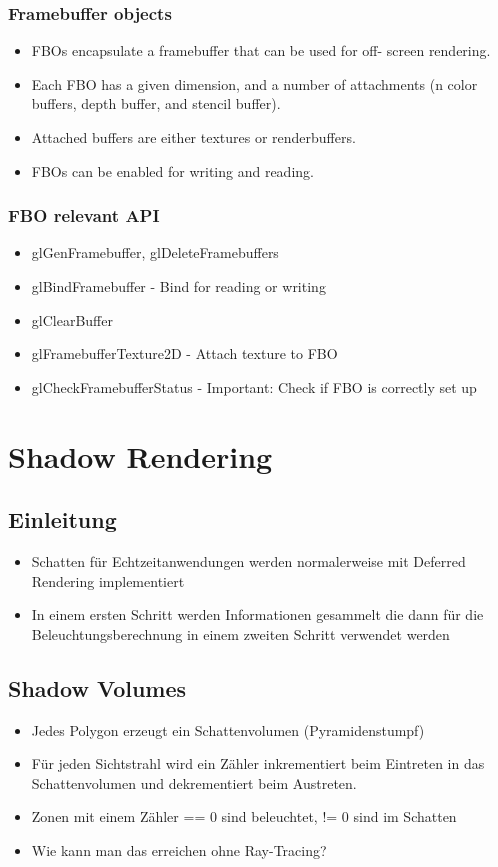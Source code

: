 \documentclass[10pt]{article}
\begin{document}
\subsubsection{Framebuffer objects}
\begin{itemize}
	\item FBOs encapsulate a framebuffer that can be used for off- screen rendering.
	\item Each FBO has a given dimension, and a number of attachments (n color buffers, depth buffer, and stencil buffer).
	\item Attached buffers are either textures or renderbuffers. 
	\item FBOs can be enabled for writing and reading.
\end{itemize}
\subsubsection{FBO relevant API}
\begin{itemize}
	\item glGenFramebuffer, glDeleteFramebuffers
	\item glBindFramebuffer - Bind for reading or writing
	\item glClearBuffer
	\item glFramebufferTexture2D - Attach texture to FBO
	\item glCheckFramebufferStatus -  Important: Check if FBO is correctly set up
\end{itemize}

\newpage
\section{Shadow Rendering}
\subsection{Einleitung}
\begin{itemize}
	\item Schatten für Echtzeitanwendungen werden normalerweise mit Deferred Rendering implementiert
	\item In einem ersten Schritt werden Informationen gesammelt die dann für die Beleuchtungsberechnung in einem zweiten Schritt verwendet werden
\end{itemize}
\subsection{Shadow Volumes}
\begin{itemize}
	\item Jedes Polygon erzeugt ein Schattenvolumen (Pyramidenstumpf)
	\item Für jeden Sichtstrahl wird ein Zähler inkrementiert beim Eintreten in das Schattenvolumen und dekrementiert beim Austreten.
	\item Zonen mit einem Zähler == 0 sind beleuchtet, != 0 sind im Schatten
	\item Wie kann man das erreichen ohne Ray-Tracing?
\end{itemize}
\end{document}
